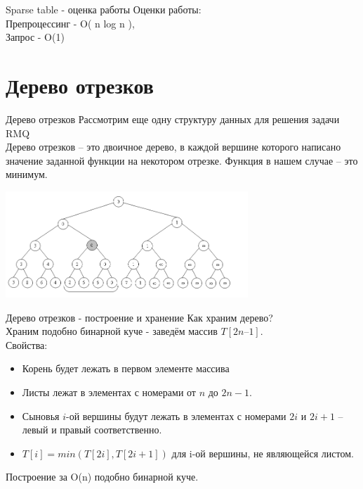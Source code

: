 \documentclass[10pt]{beamer}
\begin{document}
\begin{frame}[fragile]{Sparse table - оценка работы}
Оценки работы: \\
Препроцессинг - O( n log n ), \\
Запрос - O(1)
\end{frame}

\section{Дерево отрезков}

\begin{frame}[fragile]{Дерево отрезков}
Рассмотрим еще одну структуру данных для решения задачи RMQ\\
Дерево отрезков -- это двоичное дерево, в каждой вершине которого написано значение заданной функции на некотором отрезке. Функция в нашем случае – это минимум. 
\begin{center}
    \includegraphics[height=4cm]{Term_2/Source/images/9-segment-tree-0.png}
\end{center}
\end{frame}

\begin{frame}[fragile]{Дерево отрезков - построение и хранение}
Как храним дерево?\\
Храним подобно бинарной куче - заведём массив $T[2n – 1]$. \\
Свойства:
\begin{itemize}
    \item Корень будет лежать в первом элементе массива
    \item Листы лежат в элементах с номерами от $n$ до $2n-1$. 
    \item Сыновья $i$-ой вершины будут лежать в элементах с номерами $2i$ и $2i + 1$ – левый и правый соответственно.
    \item $T[i] = min(T[2i], T[2i + 1])$ для i-ой вершины, не являющейся листом. 
\end{itemize}
Построение за O(n) подобно бинарной куче.
\end{frame}
\end{document}
